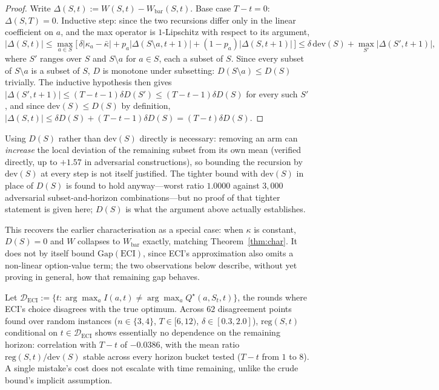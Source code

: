 \begin{proof}
Write $\Delta(S,t):=W(S,t)-W_{\mathrm{bar}}(S,t)$.
Base case $T-t=0$: $\Delta(S,T)=0$. Inductive step: since the two recursions
differ only in the linear coefficient on $a$, and the max operator is
$1$-Lipschitz with respect to its argument,
\[
|\Delta(S,t)| \le \max_{a\in S}\big[\,\delta|\kappa_a-\bar\kappa| +
p_a|\Delta(S{\setminus}a,t{+}1)| + (1-p_a)|\Delta(S,t{+}1)|\,\big]
\le \delta\,\mathrm{dev}(S) + \max_{S'}|\Delta(S',t{+}1)|,
\]
where $S'$ ranges over $S$ and $S{\setminus}a$ for $a\in S$, each a subset of
$S$. Since every subset of $S{\setminus}a$ is a subset of $S$, $D$ is monotone
under subsetting: $D(S{\setminus}a)\le D(S)$ trivially. The inductive
hypothesis then gives $|\Delta(S',t{+}1)|\le(T{-}t{-}1)\delta D(S')\le(T{-}t{-}1)\delta D(S)$
for every such $S'$, and since $\mathrm{dev}(S)\le D(S)$ by definition,
$|\Delta(S,t)|\le\delta D(S)+(T{-}t{-}1)\delta D(S)=(T{-}t)\delta D(S)$.
\end{proof}

Using $D(S)$ rather than $\mathrm{dev}(S)$ directly is necessary: removing an
arm can \emph{increase} the local deviation of the remaining subset from its
own mean (verified directly, up to $+1.57$ in adversarial constructions), so
bounding the recursion by $\mathrm{dev}(S)$ at every step is not itself
justified. The tighter bound with $\mathrm{dev}(S)$ in place of $D(S)$ is
found to hold anyway---worst ratio $1.0000$ against $3{,}000$ adversarial
subset-and-horizon combinations---but no proof of that tighter statement is
given here; $D(S)$ is what the argument above actually establishes.

This recovers the earlier characterisation as a special case: when $\kappa$ is
constant, $D(S)=0$ and $W$ collapses to $W_{\mathrm{bar}}$ exactly, matching
Theorem~\ref{thm:char}. It does not by itself bound $\mathrm{Gap}(\mathrm{ECI})$,
since ECI's approximation also omits a non-linear option-value term; the two
observations below describe, without yet proving in general, how that
remaining gap behaves.

\begin{observation}
\label{obs:disagreecost}
Let $\mathcal{D}_{\mathrm{ECI}} := \{t : \arg\max_a I(a,t) \neq \arg\max_a
Q^\star(a,S_t,t)\}$, the rounds where ECI's choice disagrees with the true
optimum. Across $62$ disagreement points found over random instances
($n\in\{3,4\}$, $T\in[6,12)$, $\delta\in[0.3,2.0]$), $\mathrm{reg}(S,t)$
conditional on $t\in\mathcal{D}_{\mathrm{ECI}}$ shows essentially no
dependence on the remaining horizon: correlation with $T-t$ of $-0.0386$,
with the mean ratio $\mathrm{reg}(S,t)/\mathrm{dev}(S)$ stable across every
horizon bucket tested ($T-t$ from $1$ to $8$). A single mistake's cost does
not escalate with time remaining, unlike the crude bound's implicit
assumption.
\end{observation}

